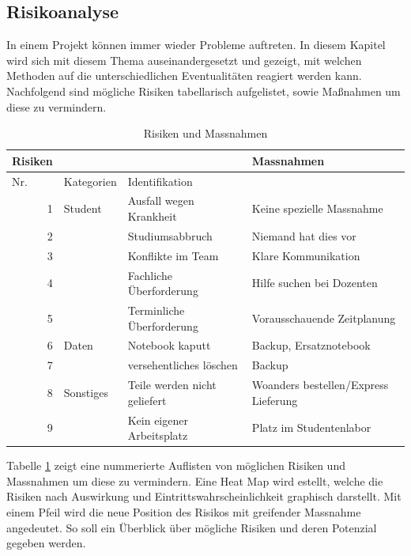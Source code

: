\subsection{Risikoanalyse}
In einem Projekt können immer wieder Probleme auftreten. In diesem Kapitel wird sich mit diesem Thema auseinandergesetzt und gezeigt, mit welchen Methoden auf die unterschiedlichen Eventualitäten reagiert werden kann.
Nachfolgend sind mögliche Risiken tabellarisch aufgelistet, sowie Maßnahmen um diese zu vermindern.\\
\begin{table}[htbp]
  \centering
  \caption{Risiken und Massnahmen}
    \begin{tabular}{|r|r|l|l|}
    \toprule
    \multicolumn{1}{|l}{\textbf{Risiken}} & \multicolumn{1}{r}{} &       & \textbf{Massnahmen} \\
    \hline
    \multicolumn{1}{|l|}{Nr.} & \multicolumn{1}{l|}{Kategorien} & Identifikation &  \\
    \hline
    1     & \multicolumn{1}{l|}{Student} & Ausfall wegen Krankheit & Keine spezielle Massnahme \\
\cline{1-1}\cline{3-4}    2     &       & Studiumsabbruch & Niemand hat dies vor \\
\cline{1-1}\cline{3-4}    3     &       & Konflikte im Team & Klare Kommunikation \\
\cline{1-1}\cline{3-4}    4     &       & Fachliche Überforderung & Hilfe suchen bei Dozenten \\
\cline{1-1}\cline{3-4}    5     &       & Terminliche Überforderung & Vorausschauende Zeitplanung \\
    \hline
    6     & \multicolumn{1}{l|}{Daten} & Notebook kaputt & Backup, Ersatznotebook \\
\cline{1-1}\cline{3-4}    7     &       & versehentliches löschen & Backup \\
    \hline
    8     & \multicolumn{1}{l|}{Sonstiges} & Teile werden nicht geliefert & Woanders bestellen/Express Lieferung\\
\cline{1-1}\cline{3-4}    9     &       & Kein eigener Arbeitsplatz & Platz im Studentenlabor \\
    \bottomrule
    \end{tabular}%
  \label{tab:RisikenUndMassnahmen}%
\end{table}%

Tabelle \ref{tab:RisikenUndMassnahmen} zeigt eine nummerierte Auflisten von möglichen Risiken und Massnahmen um diese zu vermindern. Eine Heat Map wird estellt, welche die Risiken nach Auswirkung und Eintrittswahrscheinlichkeit graphisch darstellt. Mit einem Pfeil wird die neue Position des Risikos mit greifender Massnahme angedeutet. So soll ein Überblick über mögliche Risiken und deren Potenzial gegeben werden.\\

